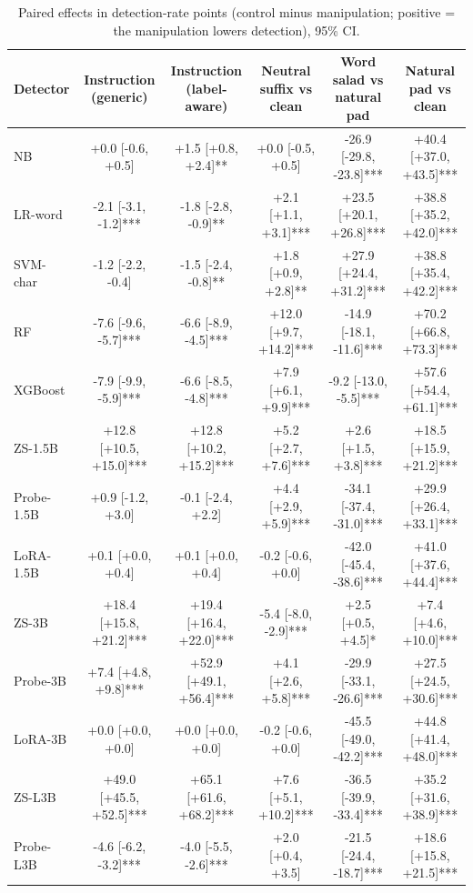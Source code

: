 \begin{table}[t]
\centering
\caption{Paired effects in detection-rate points (control minus manipulation; positive = the manipulation lowers detection), 95\% CI.}
\label{tab:effects}
\footnotesize
\begin{tabular}{lccccc}
\toprule
\textbf{Detector} & \textbf{Instruction (generic)} & \textbf{Instruction (label-aware)} & \textbf{Neutral suffix vs clean} & \textbf{Word salad vs natural pad} & \textbf{Natural pad vs clean} \\
\midrule
NB & +0.0 [-0.6, +0.5] & +1.5 [+0.8, +2.4]** & +0.0 [-0.5, +0.5] & -26.9 [-29.8, -23.8]*** & +40.4 [+37.0, +43.5]*** \\
LR-word & -2.1 [-3.1, -1.2]*** & -1.8 [-2.8, -0.9]** & +2.1 [+1.1, +3.1]*** & +23.5 [+20.1, +26.8]*** & +38.8 [+35.2, +42.0]*** \\
SVM-char & -1.2 [-2.2, -0.4] & -1.5 [-2.4, -0.8]** & +1.8 [+0.9, +2.8]** & +27.9 [+24.4, +31.2]*** & +38.8 [+35.4, +42.2]*** \\
RF & -7.6 [-9.6, -5.7]*** & -6.6 [-8.9, -4.5]*** & +12.0 [+9.7, +14.2]*** & -14.9 [-18.1, -11.6]*** & +70.2 [+66.8, +73.3]*** \\
XGBoost & -7.9 [-9.9, -5.9]*** & -6.6 [-8.5, -4.8]*** & +7.9 [+6.1, +9.9]*** & -9.2 [-13.0, -5.5]*** & +57.6 [+54.4, +61.1]*** \\
ZS-1.5B & +12.8 [+10.5, +15.0]*** & +12.8 [+10.2, +15.2]*** & +5.2 [+2.7, +7.6]*** & +2.6 [+1.5, +3.8]*** & +18.5 [+15.9, +21.2]*** \\
Probe-1.5B & +0.9 [-1.2, +3.0] & -0.1 [-2.4, +2.2] & +4.4 [+2.9, +5.9]*** & -34.1 [-37.4, -31.0]*** & +29.9 [+26.4, +33.1]*** \\
LoRA-1.5B & +0.1 [+0.0, +0.4] & +0.1 [+0.0, +0.4] & -0.2 [-0.6, +0.0] & -42.0 [-45.4, -38.6]*** & +41.0 [+37.6, +44.4]*** \\
ZS-3B & +18.4 [+15.8, +21.2]*** & +19.4 [+16.4, +22.0]*** & -5.4 [-8.0, -2.9]*** & +2.5 [+0.5, +4.5]* & +7.4 [+4.6, +10.0]*** \\
Probe-3B & +7.4 [+4.8, +9.8]*** & +52.9 [+49.1, +56.4]*** & +4.1 [+2.6, +5.8]*** & -29.9 [-33.1, -26.6]*** & +27.5 [+24.5, +30.6]*** \\
LoRA-3B & +0.0 [+0.0, +0.0] & +0.0 [+0.0, +0.0] & -0.2 [-0.6, +0.0] & -45.5 [-49.0, -42.2]*** & +44.8 [+41.4, +48.0]*** \\
ZS-L3B & +49.0 [+45.5, +52.5]*** & +65.1 [+61.6, +68.2]*** & +7.6 [+5.1, +10.2]*** & -36.5 [-39.9, -33.4]*** & +35.2 [+31.6, +38.9]*** \\
Probe-L3B & -4.6 [-6.2, -3.2]*** & -4.0 [-5.5, -2.6]*** & +2.0 [+0.4, +3.5] & -21.5 [-24.4, -18.7]*** & +18.6 [+15.8, +21.5]*** \\

\end{tabular}
\end{table}
